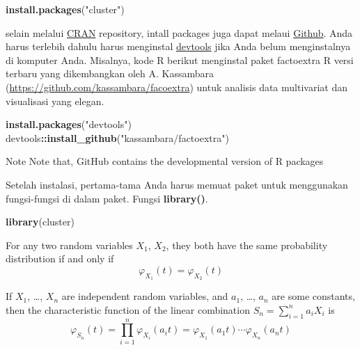 \documentclass[
]{elegantbook}
\newenvironment{Shaded}{\begin{snugshade}}{\end{snugshade}}
\newcommand{\FunctionTok}[1]{\textcolor[rgb]{0.13,0.29,0.53}{\textbf{#1}}}
\newcommand{\NormalTok}[1]{#1}
\newcommand{\SpecialCharTok}[1]{\textcolor[rgb]{0.81,0.36,0.00}{\textbf{#1}}}
\newcommand{\StringTok}[1]{\textcolor[rgb]{0.31,0.60,0.02}{#1}}
\begin{document}
\begin{Shaded}
\begin{Highlighting}[]
\FunctionTok{install.packages}\NormalTok{(}\StringTok{"cluster"}\NormalTok{)}
\end{Highlighting}
\end{Shaded}

selain melalui \href{https://cran.r-project.org/}{CRAN} repository, intall packages juga dapat melaui \href{https://github.com/}{Github}. Anda harus terlebih dahulu harus menginstal \href{https://cran.r-project.org/web/packages/devtools/index.html}{devtools} jika Anda belum menginstalnya di komputer Anda. Misalnya, kode R berikut menginstal paket factoextra R versi terbaru yang dikembangkan oleh A. Kassambara (\url{https://github.com/kassambara/facoextra}) untuk analisis data multivariat dan visualisasi yang elegan.

\begin{Shaded}
\begin{Highlighting}[]
\FunctionTok{install.packages}\NormalTok{(}\StringTok{"devtools"}\NormalTok{)}
\NormalTok{devtools}\SpecialCharTok{::}\FunctionTok{install\_github}\NormalTok{(}\StringTok{"kassambara/factoextra"}\NormalTok{)}
\end{Highlighting}
\end{Shaded}

\begin{rmdnote}{Note}
Note that, GitHub contains the developmental version of R packages

\end{rmdnote}

Setelah instalasi, pertama-tama Anda harus memuat paket untuk menggunakan fungsi-fungsi di dalam paket. Fungsi \textbf{library()}.

\begin{Shaded}
\begin{Highlighting}[]
\FunctionTok{library}\NormalTok{(cluster)}
\end{Highlighting}
\end{Shaded}

\begin{lemma}
\protect\hypertarget{lem:chf-pdf}{}\label{lem:chf-pdf}For any two random variables \(X_1\), \(X_2\), they both have the same probability distribution if and only if \[\varphi _{X_1}(t)=\varphi _{X_2}(t)\]
\end{lemma}

\begin{theorem}
\protect\hypertarget{thm:chf-sum}{}\label{thm:chf-sum}If \(X_1\), \ldots, \(X_n\) are independent random variables, and \(a_1\), \ldots, \(a_n\) are some constants, then the characteristic function of the linear combination \(S_n=\sum_{i=1}^na_iX_i\) is \[\varphi _{S_{n}}(t)=\prod_{i=1}^n\varphi _{X_i}(a_{i}t)=\varphi _{X_{1}}(a_{1}t)\cdots \varphi _{X_{n}}(a_{n}t)\]
\end{theorem}
\end{document}
